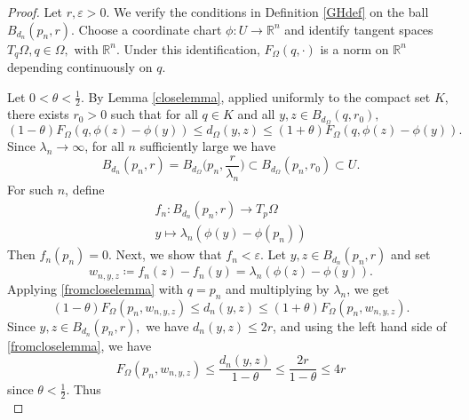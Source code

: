 \documentclass[letterpaper, 11pt, reqno]{amsart}
\theoremstyle{definition}
\begin{document}
\begin{proof}
    Let $r,\varepsilon>0$. We verify the conditions in Definition \ref{GHdef} on the ball $B_{d_n}(p_n,r).$ Choose a coordinate chart $\phi:U\longrightarrow\mathbb{R}^n$ and identify tangent spaces $T_q\Omega, q \in \Omega,$ with $\mathbb{R}^n.$ Under this identification, $F_\Omega(q,\cdot)$ is a norm on $\mathbb{R}^n$ depending continuously on $q$. 

    Let $0 < \theta< \frac{1}{2}$. By Lemma \ref{closelemma}, applied uniformly to the compact set $K$, there exists $r_0 > 0$ such that for all $q \in K$ and all $y,z \in B_{d_\Omega}(q,r_0),$
    \begin{equation}\label{fromcloselemma}
        (1-\theta)F_\Omega(q, \phi(z)-\phi(y)) \leq d_\Omega(y,z) \leq (1+\theta)F_\Omega(q,\phi(z)-\phi(y)).
    \end{equation}
    Since $\lambda_n \longrightarrow\infty$, for all $n$ sufficiently large we have
    \begin{equation}
        B_{d_n}(p_n,r)=B_{d_\Omega}\bigg(p_n,\frac{r}{\lambda_n}\bigg) \subset B_{d_\Omega}(p_n,r_0) \subset U.
    \end{equation}
    For such $n$, define 
    \begin{align}
        f_n: B_{d_n}(p_n,r) \longrightarrow T_p\Omega \\
        y \longmapsto \lambda_n(\phi(y)-\phi(p_n))
    \end{align}
    Then $f_n(p_n) = 0.$
    Next, we show that $f_n < \varepsilon$. Let $y,z \in B_{d_n}(p_n,r)$ and set
    \begin{equation}
        w_{n,y,z} \coloneq f_n(z) -f_n(y) = \lambda_n(\phi(z)-\phi(y)).
    \end{equation}
    Applying \ref{fromcloselemma} with $q=p_n$ and multiplying by $\lambda_n$, we get
    \begin{equation}\label{scaledfromcloselemma}
    (1-\theta)F_\Omega(p_n, w_{n,y,z}) \leq d_n(y,z) \leq (1+\theta)F_\Omega(p_n,w_{n,y,z}).    
    \end{equation}
    Since $y,z \in B_{d_n}(p_n,r),$ we have $d_n(y,z)\leq 2r$, and using the left hand side of \ref{fromcloselemma}, we have
    \begin{equation}\label{4r}
        F_\Omega(p_n,w_{n,y,z}) \leq \frac{d_n(y,z)}{1-\theta} \leq \frac{2r}{1-\theta} \leq 4r
    \end{equation}
    since $\theta < \frac{1}{2}$. Thus
    \begin{equation}\label{dis4rtheta}

\end{equation}
\end{proof}
\end{document}
